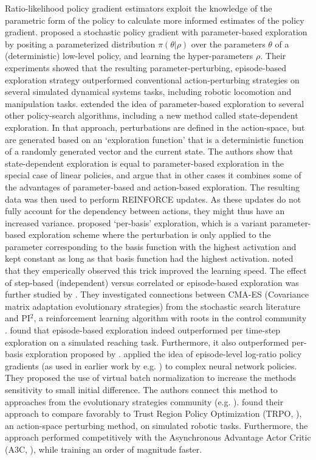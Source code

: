 Ratio-likelihood policy gradient estimators exploit the knowledge of the parametric form of the policy to calculate more informed estimates of the policy gradient.  proposed a stochastic policy gradient with parameter-based exploration by positing a parameterized distribution $\pi(\theta|\rho)$ over the parameters $\theta$ of a (deterministic) low-level policy, and learning the hyper-parameters $\rho$. Their experiments showed that the resulting parameter-perturbing, episode-based exploration strategy outperformed conventional action-perturbing strategies on several simulated dynamical systems tasks, including robotic locomotion and manipulation tasks.  extended the idea of parameter-based exploration to several other policy-search algorithms, including a new method called state-dependent exploration. In that approach, perturbations are defined in the action-space, but are generated based on an `exploration function' that is a deterministic function of a randomly generated vector and the current state. The authors show that state-dependent exploration is equal to parameter-based exploration in the special case of linear policies, and argue that in other cases it combines some of the advantages of parameter-based and action-based exploration. The resulting data was then used to perform REINFORCE updates. As these updates do not fully account for the dependency between actions, they might thus have an increased variance. 
 proposed `per-basis' exploration, which is a variant parameter-based exploration scheme where the perturbation is only applied to the parameter corresponding to the basis function with the highest activation and kept constant as long as that basis function had the highest activation.  noted that they emperically observed this trick improved the learning speed.
The effect of step-based (independent) versus correlated or episode-based exploration was further studied by . 
They investigated connections between CMA-ES (Covariance matrix adaptation evolutionary strategies) from the stochastic search literature  and PI$^2$, a reinforcement learning algorithm with roots in the control community .  found that episode-based exploration indeed outperformed per time-step exploration on a simulated reaching task. Furthermore, it also outperformed per-basis exploration proposed by . 
 applied the idea of episode-level log-ratio policy gradients (as used in earlier work by e.g. \citealt{sehnke2010parameter}) to complex neural network policies. They proposed the use of virtual batch normalization to increase the methods sensitivity to small initial difference. The authors connect this method to approaches from the evolutionary strategies community (e.g. \citealt{koutnik2010evolving}).  found their approach to compare favorably to Trust Region Policy Optimization (TRPO, \citealt{schulman2015trust}), an action-space perturbing method, on simulated robotic tasks. Furthermore, the approach performed competitively with the Asynchronous Advantage Actor Critic (A3C, \citealt{mnih2016asynchronous}), while training an order of magnitude faster.
